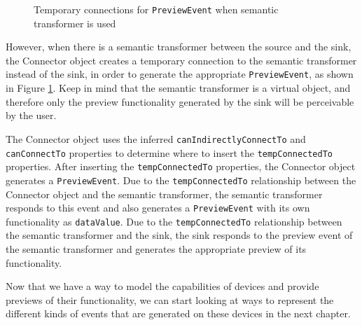 \begin{figure}[bth]
	\caption{Temporary connections for \texttt{PreviewEvent} when semantic transformer is used}
	\label{stPreview}        
\end{figure}

However, when there is a semantic transformer between the source and the sink, the Connector object creates a temporary connection to the semantic transformer instead of the sink, in order to generate the appropriate \texttt{PreviewEvent}, as shown in Figure \ref{stPreview}. Keep in mind that the semantic transformer is a virtual object, and therefore only the preview functionality generated by the sink will be perceivable by the user.

The Connector object uses the inferred \texttt{can\-Indirectly\-Connect\-To} and \texttt{canConnectTo} properties to determine where to insert the \texttt{temp\-Connected\-To} properties. After inserting the \texttt{temp\-Connected\-To} properties, the Connector object generates a \texttt{PreviewEvent}. Due to the \texttt{tempConnectedTo} relationship between the Connector object and the semantic transformer, the semantic transformer responds to this event and also generates a \texttt{PreviewEvent} with its own functionality as \texttt{data\-Value}. Due to the \texttt{tempConnectedTo} relationship between the semantic transformer and the sink, the sink responds to the preview event of the semantic transformer and generates the appropriate preview of its functionality.

Now that we have a way to model the capabilities of devices and provide previews of their functionality, we can start looking at ways to represent the different kinds of events that are generated on these devices in the next chapter.